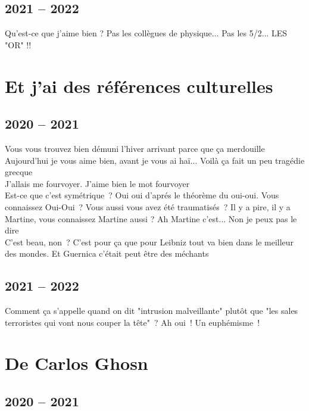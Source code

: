 \documentclass[french, a4paper, openany]{book}
\begin{document}
\section{2021 -- 2022}

	\noindent \og Qu'est-ce que j'aime bien ? Pas les collègues de physique... Pas les 5/2... LES "OR" !! \fg \\
	
\chapter{Et j'ai des références culturelles}

\section{2020 -- 2021}

	\noindent \og Vous vous trouvez bien démuni l'hiver arrivant parce que ça merdouille \fg \\
	\og Aujourd'hui je vous aime bien, avant je vous ai haï... Voilà ça fait un peu tragédie grecque \fg \\
	\og J'allais me fourvoyer. J'aime bien le mot fourvoyer \fg \\
	\og Est-ce que c'est symétrique~? Oui oui d'aprés le théorème du oui-oui. Vous connaissez Oui-Oui~? Vous aussi vous avez été traumatisés~? Il y a pire, il y a Martine, vous connaissez Martine aussi ? Ah Martine c'est... Non je peux pas le dire \fg \\
	\og C'est beau, non~? C'est pour ça que pour Leibniz tout va bien dans le meilleur des mondes. Et Guernica c'était peut être des méchants \fg \\	

\section{2021 -- 2022}

	\noindent \og Comment ça s'appelle quand on dit "intrusion malveillante" plutôt que "les sales terroristes qui vont nous couper la tête"~? Ah oui~! Un euphémisme~! \fg \\
 
\chapter{De Carlos Ghosn}

\section{2020 -- 2021}
\end{document}
